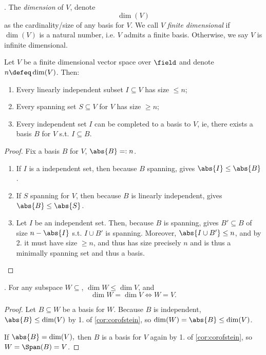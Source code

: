 \begin{definition}[Dimension]
     . The \emph{dimension} of $V$, denote $$\dim (V)$$ as the cardinality/size of any basis for $V$. We call $V$ \emph{finite dimensional} if $\dim (V)$ is a natural number, i.e. $V$ admits a finite basis. Otherwise, we say $V$ is infinite dimensional.
\end{definition}

\begin{corollary}\label{cor:corofstein}
    Let $V$ be a finite dimensional vector space over $\field$ and denote $n \defeq \dim (V)$. Then: 
    \begin{enumerate}
        \item Every linearly independent subset $I \subseteq V$ has size $\leq n$;
        \item Every spanning set $S \subseteq V$ for $V$ has size $\geq n$;
        \item Every independent set $I$ can be completed to a basis to $V$, ie, there exists a basis $B$ for $V$ s.t. $I \subseteq B$.
    \end{enumerate}
\end{corollary}

\begin{proof}
    Fix a basis $B$ for $V$, $\abs{B} =: n$.
    \begin{enumerate}
        \item If $I$ is a independent set, then because $B$ spanning,  gives $\abs{I} \leq \abs{B}$.
        \item If $S$ spanning for $V$, then because $B$ is linearly independent,  gives $\abs{B} \leq \abs{S}$.
        \item Let $I$ be an independent set. Then, because $B$ is spanning,  gives $B' \subseteq B$ of size $n - \abs{I}$ s.t. $I \cup B'$ is spanning. Moreover, $\abs{I \cup B'} \leq n$, and by 2. it must have size $\geq n$, and thus has size precisely $n$ and is thus a minimally spanning set and thus a basis.
    \end{enumerate}
\end{proof}

\begin{corollary}
     . For any subspace $W \subseteq $, $\dim W \leq \dim V$, and $$\dim W = \dim V \iff W = V.$$
\end{corollary}

\begin{proof}
    Let $B \subseteq W$ be a basis for $W$. Because $B$ is independent, $\abs{B} \leq \dim (V)$ by 1. of \cref{cor:corofstein}, so $\dim (W) = \abs{B} \leq \dim (V)$.

    If $\abs{B} = \dim (V),$ then $B$ is a basis for $V$ again by 1. of \cref{cor:corofstein}, so $W = \Span (B) = V$.
\end{proof}